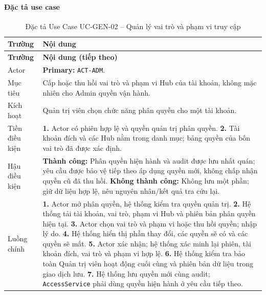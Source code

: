 \paragraph{Đặc tả use case}
\small
\begin{longtable}{|L{26mm}|L{118mm}|}
  \caption{Đặc tả Use Case UC-GEN-02 -- Quản lý vai trò và phạm vi truy cập}\label{tab:spec-UC-GEN-02}\\
  \hline
  \textbf{Trường} & \textbf{Nội dung}\\\hline
  \endfirsthead
  \hline
  \textbf{Trường} & \textbf{Nội dung (tiếp theo)}\\\hline
  \endhead
  Actor & \textbf{Primary:} \texttt{ACT-ADM}.\\\hline
  Mục tiêu & Cấp hoặc thu hồi vai trò và phạm vi Hub của tài khoản, không mặc nhiên cho Admin quyền vận hành.\\\hline
  Kích hoạt & Quản trị viên chọn chức năng phân quyền cho một tài khoản.\\\hline
  Tiền điều kiện & \textbf{1.} Actor có phiên hợp lệ và quyền quản trị phân quyền.\newline
\textbf{2.} Tài khoản đích và các Hub nằm trong danh mục; bảng quyền của bốn vai trò đã được xác định.\\\hline
  Hậu điều kiện & \textbf{Thành công:} Phân quyền hiện hành và audit được lưu nhất quán; yêu cầu được bảo vệ tiếp theo áp dụng quyền mới, không chấp nhận quyền cũ đã thu hồi.\newline
  \textbf{Không thành công:} Không lưu một phần; giữ dữ liệu hợp lệ, nêu nguyên nhân/kết quả tra cứu lại.\\\hline
  Luồng chính & \textbf{1.} Actor mở phân quyền, hệ thống kiểm tra quyền quản trị.\newline
\textbf{2.} Hệ thống tải tài khoản, vai trò, phạm vi Hub và phiên bản phân quyền hiện tại.\newline
\textbf{3.} Actor chọn vai trò và phạm vi hoặc thu hồi quyền; nhập lý do.\newline
\textbf{4.} Hệ thống hiển thị phần thay đổi, các quyền sẽ có và các quyền sẽ mất.\newline
\textbf{5.} Actor xác nhận; hệ thống xác minh lại phiên, tài khoản đích, vai trò và phạm vi hợp lệ.\newline
\textbf{6.} Hệ thống kiểm tra bảo toàn Quản trị viên hoạt động cuối cùng và phiên bản dữ liệu trong giao dịch lưu.\newline
\textbf{7.} Hệ thống lưu quyền mới cùng audit; \texttt{AccessService} phải dùng quyền hiện hành ở yêu cầu tiếp theo.\newline

\end{longtable}
